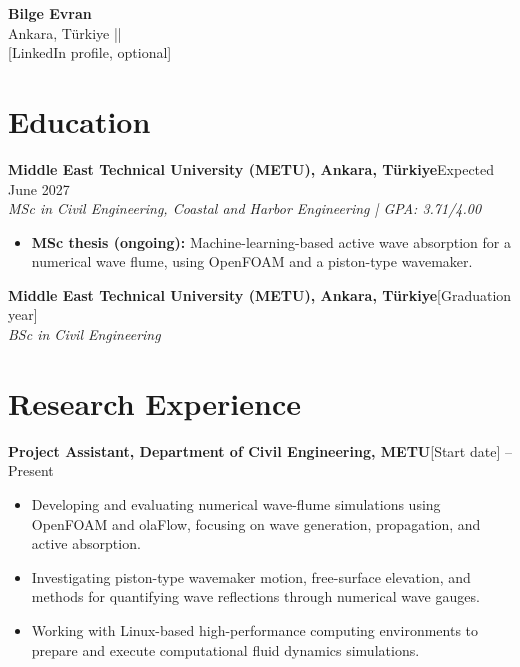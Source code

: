 \documentclass[10pt,a4paper]{article}
\newcommand{\cventry}[2]{\textbf{#1}\hfill\textcolor{muted}{#2}\\}
\newcommand{\cvsub}[1]{{\small\textit{#1}}\\[-1pt]}
\begin{document}
\begin{center}
  {\Large\bfseries Bilge Evran}\\[4pt]
  {\small Ankara, T\"urkiye \enspace| \enspace|}\\[2pt]
  {\small \textcolor{muted}{[LinkedIn profile, optional]}}
\end{center}
\vspace{-6pt}

\section*{Education}
\cventry{Middle East Technical University (METU), Ankara, T\"urkiye}{Expected June 2027}
\cvsub{MSc in Civil Engineering, Coastal and Harbor Engineering \quad | \quad GPA: 3.71/4.00}
\begin{itemize}
  \item \textbf{MSc thesis (ongoing):} Machine-learning-based active wave absorption for a numerical wave flume, using OpenFOAM and a piston-type wavemaker.
\end{itemize}
\vspace{2pt}
\cventry{Middle East Technical University (METU), Ankara, T\"urkiye}{[Graduation year]}
\cvsub{BSc in Civil Engineering}

\section*{Research Experience}
\cventry{Project Assistant, Department of Civil Engineering, METU}{[Start date] -- Present}
\begin{itemize}
  \item Developing and evaluating numerical wave-flume simulations using OpenFOAM and olaFlow, focusing on wave generation, propagation, and active absorption.
  \item Investigating piston-type wavemaker motion, free-surface elevation, and methods for quantifying wave reflections through numerical wave gauges.
  \item Working with Linux-based high-performance computing environments to prepare and execute computational fluid dynamics simulations.
\end{itemize}
\end{document}
